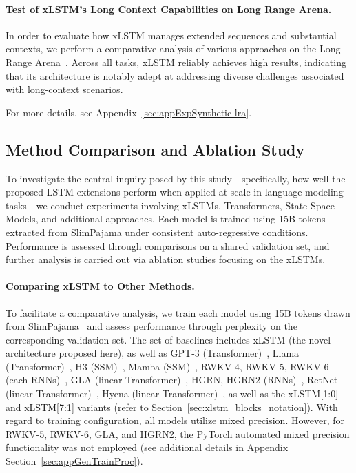 \paragraph{Test of xLSTM's Long Context Capabilities on Long Range Arena.} In order to evaluate how xLSTM manages extended sequences and substantial contexts, we perform a comparative analysis of various approaches on the Long Range Arena~\citep{Tay:21}. Across all tasks, xLSTM reliably achieves high results, indicating that its architecture is notably adept at addressing diverse challenges associated with long-context scenarios.

For more details, see Appendix~\ref{sec:appExpSynthetic-lra}.

\subsection{Method Comparison and Ablation Study}
\label{sec:ExpComparison}

To investigate the central inquiry posed by this study—specifically, how well the proposed LSTM extensions perform when applied at scale in language modeling tasks—we conduct experiments involving xLSTMs, Transformers, State Space Models, and additional approaches. Each model is trained using 15B tokens extracted from SlimPajama under consistent auto-regressive conditions. Performance is assessed through comparisons on a shared validation set, and further analysis is carried out via ablation studies focusing on the xLSTMs.

\paragraph{Comparing xLSTM to Other Methods.} To facilitate a comparative analysis, we train each model using 15B tokens drawn from SlimPajama~\citep{Soboleva:23} and assess performance through perplexity on the corresponding validation set. The set of baselines includes xLSTM (the novel architecture proposed here), as well as GPT-3 (Transformer)~\citep{Brown:20short}, Llama (Transformer)~\citep{Touvron:23arxiv}, H3 (SSM)~\citep{Fu:23}, Mamba (SSM)~\citep{Gu:24arxiv}, RWKV-4, RWKV-5, RWKV-6 (each RNNs)~\citep{Peng:23arxivshort, Peng:24arxivshort}, GLA (linear Transformer)~\citep{Yang:23arxiv}, HGRN, HGRN2 (RNNs)~\citep{Qin:23, Qin:24arxiv}, RetNet (linear Transformer)~\citep{Sun:23arxiv}, Hyena (linear Transformer)~\citep{Poli:23}, as well as the xLSTM[1:0] and xLSTM[7:1] variants (refer to Section~\ref{sec:xlstm_blocks_notation}). With regard to training configuration, all models utilize mixed precision. However, for RWKV-5, RWKV-6, GLA, and HGRN2, the PyTorch automated mixed precision functionality was not employed (see additional details in Appendix Section~\ref{sec:appGenTrainProc}).

